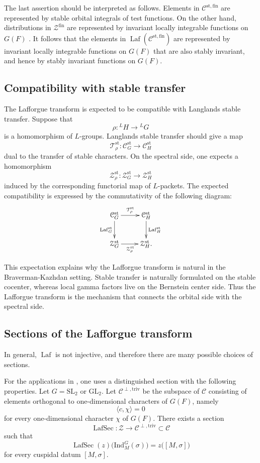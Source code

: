 \documentclass[iccmp]{ipbook}
\newcommand{\CC}{{\mathcal {C}}}
\newcommand{\CT}{{\mathcal {T}}}
\newcommand{\CZ}{{\mathcal {Z}}}
\newcommand{\GL}{{\mathrm{GL}}}
\newcommand{\Ind}{{\mathrm{Ind}}}
\newcommand{\SL}{{\mathrm{SL}}}
\newcommand{\st}{{\mathrm{st}}}
\def\sig{{\sigma}}
\newcommand{\Laf}{\operatorname{Laf}}
\newcommand{\LafSec}{\operatorname{LafSec}}
\newcommand{\fin}{\mathrm{fin}}
\newcommand{\triv}{\mathrm{triv}}
\begin{document}
The last assertion should be interpreted as follows. Elements in $\CC^{\st,\fin}$ are
represented by stable orbital integrals of test functions. On the other hand, distributions
in $\CZ^\fin$ are represented by invariant locally integrable functions on $G(F)$
\cite[Thm.~2.5]{MR1979109}. It follows that the elements in
$\Laf(\CC^{\st,\fin})$ are represented by invariant locally integrable functions on $G(F)$
that are also stably invariant, and hence by stably invariant functions on $G(F)$.

\subsection{Compatibility with stable transfer}\label{subsec:Laf-stable-transfer}

The Lafforgue transform is expected to be compatible with Langlands stable transfer. Suppose
that
\[
\rho:{}^LH\to {}^LG
\]
is a homomorphism of $L$-groups. Langlands stable transfer should give a map
\[
\CT^\st_\rho:\CC_G^{\st}\to \CC_H^{\st}
\]
dual to the transfer of stable characters. On the spectral side, one expects a homomorphism
\[
\CZ^{\st}_\rho:\CZ_G^{\st}\to \CZ_H^{\st}
\]
induced by the corresponding functorial map of $L$-packets. The expected compatibility is
expressed by the commutativity of the following diagram:
\begin{equation}\label{eq:Laf-stable-transfer-diagram}
\xymatrix{
\CC_G^{\st} \ar[r]^{\CT^\st_\rho} \ar[d]_{\Laf_G^{\st}} &
\CC_H^{\st} \ar[d]^{\Laf_H^{\st}} \\
\CZ_G^{\st} \ar[r]_{\CZ^{\st}_\rho} &
\CZ_H^{\st}.
}
\end{equation}

This expectation explains why the Lafforgue transform is natural in the
Braverman-Kazhdan setting. Stable transfer is naturally formulated on the stable cocenter,
whereas local gamma factors live on the Bernstein center side. Thus the Lafforgue transform
is the mechanism that connects the orbital side with the spectral side.

\subsection{Sections of the Lafforgue transform}\label{subsec:sections-Laf}

In general, $\Laf$ is not injective, and therefore there are many possible choices of sections.

For the applications in \cite{LN}, one uses a distinguished section with the following properties. Let
$G=\SL_2$ or $\GL_2$. Let $\CC^{\perp,\triv}$ be the subspace of $\CC$ consisting of
elements orthogonal to one-dimensional characters of $G(F)$, namely
\[
\langle c,\chi\rangle=0
\]
for every one-dimensional character $\chi$ of $G(F)$. There exists a section
\[
\LafSec:\CZ\to \CC^{\perp,\triv}\subset \CC
\]
such that
\[
\LafSec(z)\big(\Ind_M^G(\sig)\big)=z\big([M,\sig]\big)
\]
for every cuspidal datum $[M,\sig]$.
\end{document}
